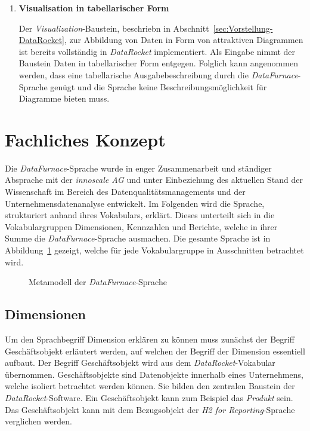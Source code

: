 \documentclass[
  language=german, %
  type=bachelor,%
  ngerman
]{isthesis}
\begin{document}
\begin{content}
\begin{enumerate}
			\item \textbf{Visualisation in tabellarischer Form}

			Der \textit{Visualization}-Baustein, beschriebn in
			Abschnitt~\ref{sec:Vorstellung-DataRocket}, zur Abbildung von Daten in
			Form von attraktiven Diagrammen ist bereits vollständig in
			\textit{DataRocket} implementiert. Als Eingabe nimmt der Baustein Daten
			in tabellarischer Form entgegen. Folglich kann angenommen werden, dass
			eine tabellarische Ausgabebeschreibung durch die
			\textit{DataFurnace}-Sprache genügt und die Sprache keine
			Beschreibungsmöglichkeit für Diagramme bieten muss.



  \end{enumerate}


  \section{Fachliches Konzept}

  Die \textit{DataFurnace}-Sprache wurde in enger Zusammenarbeit und ständiger
  Absprache mit der \textit{innoscale AG} und unter Einbeziehung des
  aktuellen Stand der Wissenschaft im Bereich des Datenqualitätsmanagements und
  der Unternehmensdatenanalyse entwickelt. Im Folgenden wird die Sprache,
  strukturiert anhand ihres Vokabulars, erklärt. Dieses unterteilt sich in die
  Vokabulargruppen Dimensionen, Kennzahlen und Berichte, welche in ihrer Summe
  die \textit{DataFurnace}-Sprache ausmachen. Die gesamte Sprache ist in
  Abbildung~\ref{fig:language_spec-erm} gezeigt, welche für jede
  Vokabulargruppe in Ausschnitten betrachtet wird.

  \begin{figure}
    \resizebox{\columnwidth}{!}{}
    \caption{Metamodell der \textit{DataFurnace}-Sprache}\label{fig:language_spec-erm}
  \end{figure}

  \subsection{Dimensionen}\label{subsec:dimension}

	Um den Sprachbegriff Dimension erklären zu können muss zunächst der Begriff
	Geschäftsobjekt erläutert werden, auf welchen der Begriff der Dimension
	essentiell aufbaut. Der Begriff Geschäftsobjekt wird aus dem
	\textit{DataRocket}-Vokabular übernommen. Geschäftsobjekte sind Datenobjekte
	innerhalb eines Unternehmens, welche isoliert betrachtet werden können. Sie
	bilden den zentralen Baustein der \textit{DataRocket}-Software. Ein
	Geschäftsobjekt kann zum Beispiel das \textit{Produkt} sein.  Das
	Geschäftsobjekt kann mit dem Bezugsobjekt der \textit{H2 for
	Reporting}-Sprache verglichen werden.


\end{content}
\end{document}
